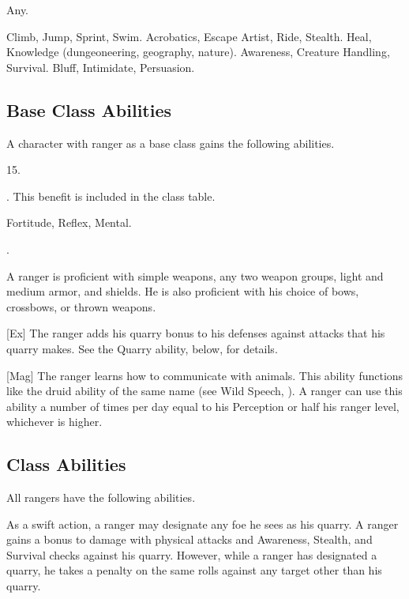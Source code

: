      Any.

     Climb, Jump, Sprint, Swim.
     Acrobatics, Escape Artist, Ride, Stealth.
     Heal, Knowledge (dungeoneering, geography, nature).
     Awareness, Creature Handling, Survival.
     Bluff, Intimidate, Persuasion.

    \subsection{Base Class Abilities}
        A character with ranger as a base class gains the following abilities.

         15.

         . This benefit is included in the class table.

          Fortitude,  Reflex,  Mental.

         .

        A ranger is proficient with simple weapons, any two weapon groups, light and medium armor, and shields.
        He is also proficient with his choice of bows, crossbows, or thrown weapons.

        [Ex]
        The ranger adds his quarry bonus to his defenses against attacks that his quarry makes.
        See the Quarry ability, below, for details.

        [Mag]
        The ranger learns how to communicate with animals.
        This ability functions like the druid ability of the same name (see Wild Speech, ).
        A ranger can use this ability a number of times per day equal to his Perception or half his ranger level, whichever is higher.

    \subsection{Class Abilities}
        All rangers have the following abilities.

        As a swift action, a ranger may designate any foe he sees as his quarry.
        A ranger gains a  bonus to damage with physical attacks and Awareness, Stealth, and Survival checks against his quarry.
        However, while a ranger has designated a quarry, he takes a  penalty on the same rolls against any target other than his quarry.

